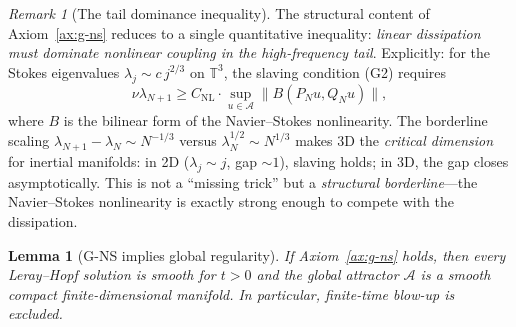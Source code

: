 \documentclass[12pt,a4paper]{article}
\theoremstyle{definition}
\theoremstyle{plain}
\newtheorem{lemma}[definition]{Lemma}
\theoremstyle{remark}
\newtheorem{remark}[definition]{Remark}
\begin{document}
\begin{remark}[The tail dominance inequality]\label{rem:tail-dominance}
The structural content of Axiom~\ref{ax:g-ns} reduces to a single quantitative inequality: \emph{linear dissipation must dominate nonlinear coupling in the high-frequency tail}. Explicitly: for the Stokes eigenvalues $\lambda_j \sim c\, j^{2/3}$ on $\mathbb{T}^3$, the slaving condition (G2) requires
\[
  \nu \lambda_{N+1} \geq C_{\mathrm{NL}} \cdot \sup_{u \in \mathcal{A}} \|B(P_N u, Q_N u)\|,
\]
where $B$ is the bilinear form of the Navier--Stokes nonlinearity. The borderline scaling $\lambda_{N+1} - \lambda_N \sim N^{-1/3}$ versus $\lambda_N^{1/2} \sim N^{1/3}$ makes 3D the \emph{critical dimension} for inertial manifolds: in 2D ($\lambda_j \sim j$, gap $\sim 1$), slaving holds; in 3D, the gap closes asymptotically. This is not a ``missing trick'' but a \emph{structural borderline}---the Navier--Stokes nonlinearity is exactly strong enough to compete with the dissipation.
\end{remark}

\begin{lemma}[G-NS implies global regularity]\label{lem:g-regularity}
If Axiom~\ref{ax:g-ns} holds, then every Leray--Hopf solution is smooth for $t > 0$ and the global attractor $\mathcal{A}$ is a smooth compact finite-dimensional manifold. In particular, finite-time blow-up is excluded.
\end{lemma}

\bigskip
\end{document}
